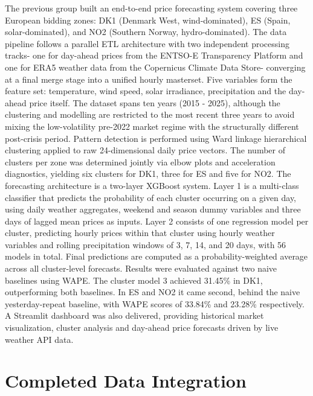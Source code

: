 \documentclass[12pt, a4paper]{article}
\begin{document}
The previous group built an end-to-end price forecasting system covering three European
bidding zones: DK1 (Denmark West, wind-dominated), ES (Spain, solar-dominated), and
NO2 (Southern Norway, hydro-dominated).
The data pipeline follows a parallel ETL architecture with two independent processing
tracks- one for day-ahead prices from the ENTSO-E Transparency Platform and one for
ERA5 weather data from the Copernicus Climate Data Store- converging at a final merge
stage into a unified hourly masterset. Five variables form the feature set: temperature,
wind speed, solar irradiance, precipitation and the day-ahead price itself. The dataset
spans ten years (2015 - 2025), although the clustering and modelling are restricted to the
most recent three years to avoid mixing the low-volatility pre-2022 market regime with
the structurally different post-crisis period.
Pattern detection is performed using Ward linkage hierarchical clustering applied to
raw 24-dimensional daily price vectors. The number of clusters per zone was determined
jointly via elbow plots and acceleration diagnostics, yielding six clusters for DK1, three
for ES and five for NO2.
The forecasting architecture is a two-layer XGBoost system. Layer 1 is a multi-class
classifier that predicts the probability of each cluster occurring on a given day, using daily
weather aggregates, weekend and season dummy variables and three days of lagged mean
prices as inputs. Layer 2 consists of one regression model per cluster, predicting hourly
prices within that cluster using hourly weather variables and rolling precipitation windows
of 3, 7, 14, and 20 days, with 56 models in total. Final predictions are computed as a
probability-weighted average across all cluster-level forecasts.
Results were evaluated against two naive baselines using WAPE. The cluster model
3
achieved 31.45\% in DK1, outperforming both baselines. In ES and NO2 it came second,
behind the naive yesterday-repeat baseline, with WAPE scores of 33.84\% and 23.28\%
respectively. A Streamlit dashboard was also delivered, providing historical market
visualization, cluster analysis and day-ahead price forecasts driven by live weather API
data.




\section{Completed Data Integration}
\end{document}
